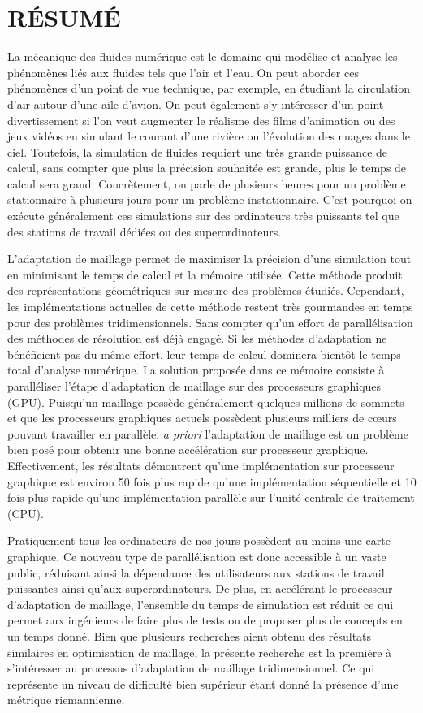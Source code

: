 \section*{\hfil RÉSUMÉ\hfil}

La mécanique des fluides numérique est le domaine qui modélise et analyse les phénomènes liés aux fluides tels que l'air et l'eau. On peut aborder ces phénomènes d'un point de vue technique, par exemple, en étudiant la circulation d'air autour d'une aile d'avion. On peut également s'y intéresser d'un point divertissement si l'on veut augmenter le réalisme des films d'animation ou des jeux vidéos en simulant le courant d'une rivière ou l'évolution des nuages dans le ciel. Toutefois, la simulation de fluides requiert une très grande puissance de calcul, sans compter que plus la précision souhaitée est grande, plus le temps de calcul sera grand. Concrètement, on parle de plusieurs heures pour un problème stationnaire à plusieurs jours pour un problème instationnaire. C'est pourquoi on exécute généralement ces simulations sur des ordinateurs très puissants tel que des stations de travail dédiées ou des superordinateurs.

L'adaptation de maillage permet de maximiser la précision d'une simulation tout en minimisant le temps de calcul et la mémoire utilisée. Cette méthode produit des représentations géométriques sur mesure des problèmes étudiés. Cependant, les implémentations actuelles de cette méthode restent très gourmandes en temps pour des problèmes tridimensionnels. Sans compter qu'un effort de parallélisation des méthodes de résolution est déjà engagé. Si les méthodes d'adaptation ne bénéficient pas du même effort, leur temps de calcul dominera bientôt le temps total d'analyse numérique. La solution proposée dans ce mémoire consiste à paralléliser l'étape d'adaptation de maillage sur des processeurs graphiques (GPU). Puisqu'un maillage possède généralement quelques millions de sommets et que les processeurs graphiques actuels possèdent plusieurs milliers de cœurs pouvant travailler en parallèle, \textit{a priori} l'adaptation de maillage est un problème bien posé pour obtenir une bonne accélération sur processeur graphique. Effectivement, les résultats démontrent qu'une implémentation sur processeur graphique est environ 50 fois plus rapide qu'une implémentation séquentielle et 10 fois plus rapide qu'une implémentation parallèle sur l'unité centrale de traitement (CPU).

Pratiquement tous les ordinateurs de nos jours possèdent au moins une carte graphique. Ce nouveau type de parallélisation est donc accessible à un vaste public, réduisant ainsi la dépendance des utilisateurs aux stations de travail puissantes ainsi qu'aux superordinateurs. De plus, en accélérant le processeur d'adaptation de maillage, l'ensemble du temps de simulation est réduit ce qui permet aux ingénieurs de faire plus de tests ou de proposer plus de concepts en un temps donné. Bien que plusieurs recherches aient obtenu des résultats similaires en optimisation de maillage, la présente recherche est la première à s'intéresser au processus d'adaptation de maillage tridimensionnel. Ce qui représente un niveau de difficulté bien supérieur étant donné la présence d'une métrique riemannienne.

